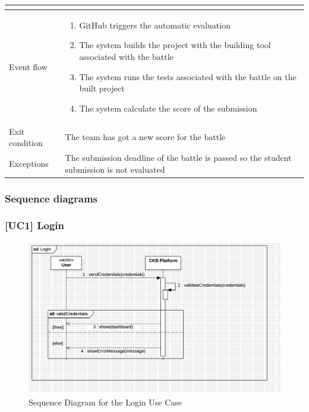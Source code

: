 \begin{enumerate}[label=UC\arabic*:]
\begin{tabular}{|p{3cm}|p{8cm}|}
\begin{itemize}
        \end{itemize} \\
        \hline
        Event flow &
        \begin{enumerate}[label=\arabic*.]
            \item GitHub triggers the automatic evaluation
            \item The system builds the project with the building tool associated with the battle
            \item The system runs the tests associated with the battle on the built project
            \item The system calculate the score of the submission
        \end{enumerate} \\
        \hline
        Exit condition & The team has got a new score for the battle \\
        \hline
        Exceptions & The submission deadline of the battle is passed so the student submission is not evaluated \\
        \hline
    \end{tabular}
\end{enumerate}

\subsubsection{Sequence diagrams}
\subsubsection*{[UC1] Login}
\begin{figure}[H]
    \centering
    \includegraphics[width=\textwidth]{Diagrams/UC1SequenceDiagram.jpg}
    \caption{Sequence Diagram for the Login Use Case}
    \label{fig:sequence-diagram-login}
\end{figure}

